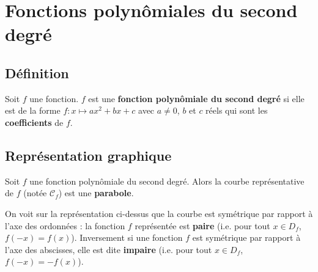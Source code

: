 






	\section{Fonctions polynômiales du second degré}

	\subsection{Définition}

	\begin{formula}[Définition]
		Soit $f$ une fonction. $f$ est une \textbf{fonction polynômiale du second degré} si elle est de la forme $f : x \mapsto ax^2 + bx + c$ avec $a \neq 0$, $b$ et $c$ réels qui sont les \textbf{coefficients} de $f$.
	\end{formula}

	\subsection{Représentation graphique}

	\begin{formula}[Parabole]
		Soit $f$ une fonction polynômiale du second degré. Alors la courbe représentative de $f$ (notée $\mathcal{C}_f$) est une \textbf{parabole}.
	\end{formula}


	\begin{tip}
		On voit sur la représentation ci-dessus que la courbe est symétrique par rapport à l'axe des ordonnées : la fonction $f$ représentée est \textbf{paire} (i.e. pour tout $x \in D_f$, $f(-x) = f(x)$).
		\newpar
		Inversement si une fonction $f$ est symétrique par rapport à l'axe des abscisses, elle est dite \textbf{impaire} (i.e. pour tout $x \in D_f$, $f(-x) = -f(x)$).
	\end{tip}

